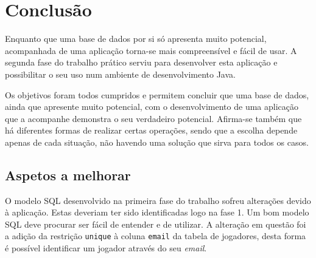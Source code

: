 %
%
\chapter{Conclusão} \label{cap4}

Enquanto que uma base de dados por si só apresenta muito potencial, acompanhada de uma aplicação torna-se mais compreensível e fácil de usar. A segunda fase
do trabalho prático serviu para desenvolver esta aplicação e possibilitar o seu uso num ambiente de desenvolvimento Java.

Os objetivos foram todos cumpridos e permitem concluir que uma base de dados, ainda que apresente muito potencial, com o desenvolvimento de uma aplicação que
a acompanhe demonstra o seu verdadeiro potencial. Afirma-se também que há diferentes formas de realizar certas operações, sendo que a escolha depende apenas
de cada situação, não havendo uma solução que sirva para todos os casos.

%
%
\section{Aspetos a melhorar} \label{sec31}

O modelo SQL desenvolvido na primeira fase do trabalho sofreu alterações devido à aplicação. Estas deveriam ter sido identificadas logo na fase 1. Um bom modelo
SQL deve procurar ser fácil de entender e de utilizar. A alteração em questão foi a adição da restrição \texttt{unique} à coluna \texttt{email} da tabela de jogadores,
desta forma é possível identificar um jogador através do seu \textit{email}.